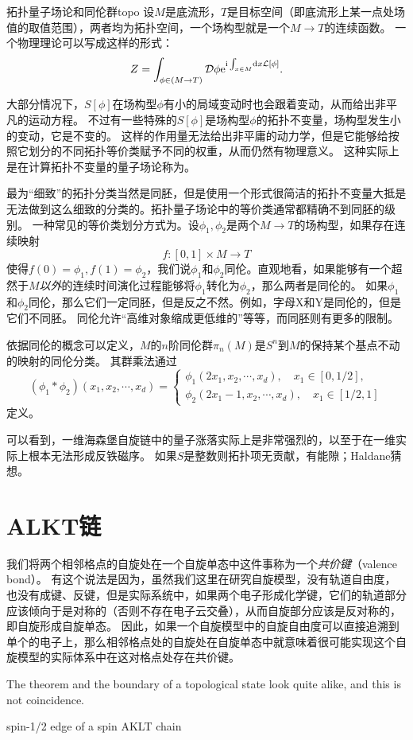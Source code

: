 \begin{back}{拓扑量子场论和同伦群}{topo}
    设$M$是底流形，$T$是目标空间（即底流形上某一点处场值的取值范围），两者均为拓扑空间，一个场构型就是一个$M \to T$的连续函数。
    一个物理理论可以写成这样的形式：
    \[
        Z = \int_{\phi \in (M \to T)} \mathcal{D} \phi \mathrm{e}^{\mathrm{i} \int_{x \in M} \dd{x} \mathcal{L}[\phi]}.
    \]

    大部分情况下，$S[\phi]$在场构型$\phi$有小的局域变动时也会跟着变动，从而给出非平凡的运动方程。
    不过有一些特殊的$S[\phi]$是场构型$\phi$的拓扑不变量，场构型发生小的变动，它是不变的。
    这样的作用量无法给出非平庸的动力学，但是它能够给按照它划分的不同拓扑等价类赋予不同的权重，从而仍然有物理意义。
    这种实际上是在计算拓扑不变量的量子场论称为。

    最为“细致”的拓扑分类当然是同胚，但是使用一个形式很简洁的拓扑不变量大抵是无法做到这么细致的分类的。拓扑量子场论中的等价类通常都精确不到同胚的级别。
    一种常见的等价类划分方式为。设$\phi_1, \phi_2$是两个$M \to T$的场构型，如果存在连续映射
    \[
        f: [0, 1] \times M \to T
    \]
    使得$f(0) = \phi_1, f(1) = \phi_2$，我们说$\phi_1$和$\phi_2$同伦。直观地看，如果能够有一个超然于$M$\emph{以外}的连续时间演化过程能够将$\phi_1$转化为$\phi_2$，那么两者是同伦的。
    如果$\phi_1$和$\phi_2$同伦，那么它们一定同胚，但是反之不然。例如，字母X和Y是同伦的，但是它们不同胚。
    同伦允许“高维对象缩成更低维的”等等，而同胚则有更多的限制。
    
    依据同伦的概念可以定义，$M$的$n$阶同伦群$\pi_n(M)$是$S^n$到$M$的保持某个基点不动的映射的同伦分类。
    其群乘法通过
    \begin{equation}
        (\phi_1 * \phi_2)(x_1, x_2, \cdots, x_d) = \begin{cases}
            \phi_1(2 x_1, x_2, \cdots, x_d), \quad x_1 \in [0, 1/2], \\
            \phi_2(2 x_1 - 1, x_2, \cdots, x_d), \quad x_1 \in [1/2, 1]
        \end{cases}
    \end{equation}
    定义。
\end{back}

可以看到，一维海森堡自旋链中的量子涨落实际上是非常强烈的，以至于在一维实际上根本无法形成反铁磁序。
如果$S$是整数则拓扑项无贡献，有能隙；Haldane猜想。 %

\section{ALKT链}

我们将两个相邻格点的自旋处在一个自旋单态中这件事称为一个\emph{共价键}（valence bond）。
有这个说法是因为，虽然我们这里在研究自旋模型，没有轨道自由度，也没有成键、反键，但是实际系统中，如果两个电子形成化学键，它们的轨道部分应该倾向于是对称的（否则不存在电子云交叠），从而自旋部分应该是反对称的，即自旋形成自旋单态。
因此，如果一个自旋模型中的自旋自由度可以直接追溯到单个的电子上，那么相邻格点处的自旋处在自旋单态中就意味着很可能实现这个自旋模型的实际体系中在这对格点处存在共价键。

The theorem and the boundary of a topological state look quite alike, and this is not coincidence.

spin-1/2 edge of a spin AKLT chain